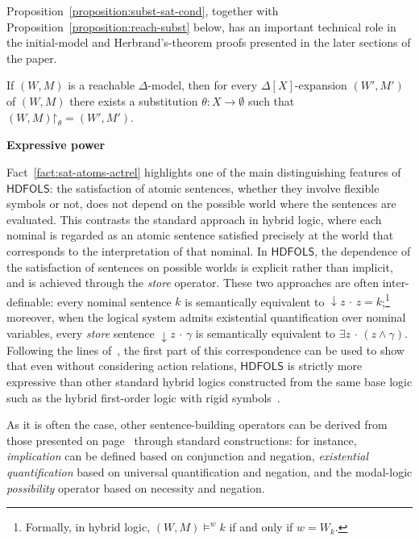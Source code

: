 \documentclass[a4paper,UKenglish,cleveref, autoref]{lipics-v2019}
\newcommand{\HDFOLS}{{\mathsf{HDFOLS}}}
\renewcommand{\models}{\vDash}
\newcommand{\red}{\mathord{\upharpoonright}}
\newcommand{\store}[1]{{\downarrow}#1\,{\cdot}\,}
\newcommand{\Exists}[1]{\exists #1\,{\cdot}\,}
\newcommand{\minisec}[1]{%
  \par\addvspace{\smallskipamount}\noindent%
  \textbf{\sffamily #1}\enspace%
}
\begin{document}
Proposition~\ref{proposition:subst-sat-cond}, together with Proposition~\ref{proposition:reach-subst} below, has an important technical role in the initial-model and Herbrand's-theorem proofs presented in the later sections of the paper.

\begin{proposition} 
  \label{proposition:reach-subst}
  If \((W, M)\) is a reachable \(\Delta\)-model, then for every \(\Delta[X]\)-expansion \((W', M')\) of \((W, M)\) there exists a substitution \(\theta \colon X \to \emptyset\) such that \((W, M) \red_{\theta} = (W', M')\).
  \pushQED{\qed}\qedhere
\end{proposition}

\minisec{Expressive power}
Fact~\ref{fact:sat-atoms-actrel} highlights one of the main distinguishing features of \(\HDFOLS\):
the satisfaction of atomic sentences, whether they involve flexible symbols or not, does not depend on the possible world where the sentences are evaluated.
This contrasts the standard approach in hybrid logic, where each nominal is regarded as an atomic sentence satisfied precisely at the world that corresponds to the interpretation of that nominal.
In \(\HDFOLS\), the dependence of the satisfaction of sentences on possible worlds is explicit rather than implicit, and is achieved through the \emph{store} operator.
These two approaches are often inter-definable:
every nominal sentence \(k\) is semantically equivalent to \(\store{z} z = k\);\footnote{Formally, in hybrid logic, \((W, M) \models^{w} k\) if and only if \(w = W_{k}\).}
moreover, when the logical system admits existential quantification over nominal variables, every \emph{store} sentence \(\store{z} \gamma\) is semantically equivalent to \(\Exists{z} (z \land \gamma)\).
Following the lines of~\cite[Section~4.3]{Gaina17Her}, the first part of this correspondence can be used to show that even without considering action relations, \(\HDFOLS\) is strictly more expressive than other standard hybrid logics constructed from the same base logic such as the hybrid first-order logic with rigid symbols~\cite{DiaconescuM16,Diaconescu16}.

As it is often the case, other sentence-building operators can be derived from those presented on page~\pageref{sentence-building-operators} through standard constructions: for instance, \emph{implication} can be defined based on conjunction and negation, \emph{existential quantification} based on universal quantification and negation, and the modal-logic \emph{possibility} operator based on necessity and negation.
\end{document}
